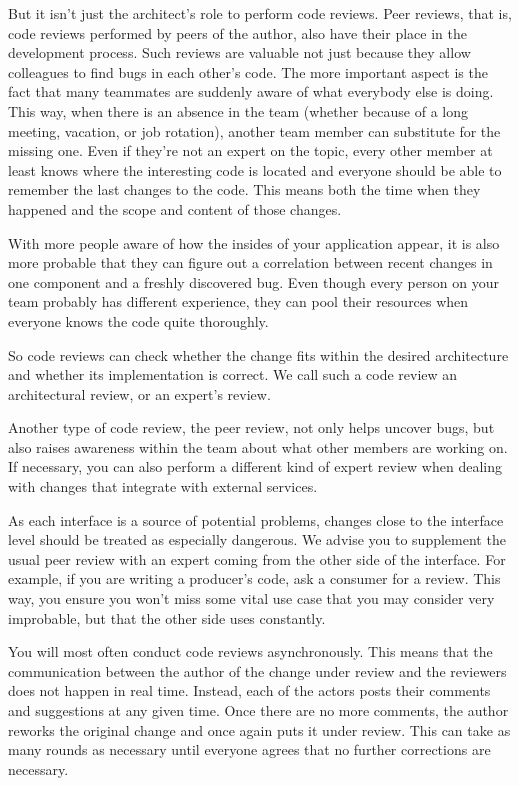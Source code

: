 But it isn't just the architect's role to perform code reviews. Peer reviews, that is, code reviews performed by peers of the author, also have their place in the development process. Such reviews are valuable not just because they allow colleagues to find bugs in each other's code. The more important aspect is the fact that many teammates are suddenly aware of what everybody else is doing. This way, when there is an absence in the team (whether because of a long meeting, vacation, or job rotation), another team member can substitute for the missing one. Even if they're not an expert on the topic, every other member at least knows where the interesting code is located and everyone should be able to remember the last changes to the code. This means both the time when they happened and the scope and content of those changes.

With more people aware of how the insides of your application appear, it is also more probable that they can figure out a correlation between recent changes in one component and a freshly discovered bug. Even though every person on your team probably has different experience, they can pool their resources when everyone knows the code quite thoroughly.

So code reviews can check whether the change fits within the desired architecture and whether its implementation is correct. We call such a code review an architectural review, or an expert's review.

Another type of code review, the peer review, not only helps uncover bugs, but also raises awareness within the team about what other members are working on. If necessary, you can also perform a different kind of expert review when dealing with changes that integrate with external services.

As each interface is a source of potential problems, changes close to the interface level should be treated as especially dangerous. We advise you to supplement the usual peer review with an expert coming from the other side of the interface. For example, if you are writing a producer's code, ask a consumer for a review. This way, you ensure you won't miss some vital use case that you may consider very improbable, but that the other side uses constantly.


You will most often conduct code reviews asynchronously. This means that the communication between the author of the change under review and the reviewers does not happen in real time. Instead, each of the actors posts their comments and suggestions at any given time. Once there are no more comments, the author reworks the original change and once again puts it under review. This can take as many rounds as necessary until everyone agrees that no further corrections are necessary.

